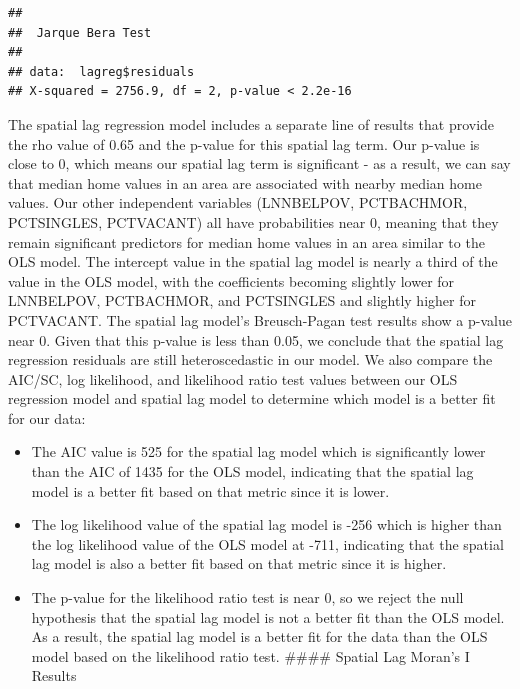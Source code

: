 \documentclass[
]{article}
\providecommand{\tightlist}{%
  \setlength{\itemsep}{0pt}\setlength{\parskip}{0pt}}
\begin{document}
\begin{verbatim}
## 
##  Jarque Bera Test
## 
## data:  lagreg$residuals
## X-squared = 2756.9, df = 2, p-value < 2.2e-16
\end{verbatim}

The spatial lag regression model includes a separate line of results
that provide the rho value of 0.65 and the p-value for this spatial lag
term. Our p-value is close to 0, which means our spatial lag term is
significant - as a result, we can say that median home values in an area
are associated with nearby median home values. Our other independent
variables (LNNBELPOV, PCTBACHMOR, PCTSINGLES, PCTVACANT) all have
probabilities near 0, meaning that they remain significant predictors
for median home values in an area similar to the OLS model. The
intercept value in the spatial lag model is nearly a third of the value
in the OLS model, with the coefficients becoming slightly lower for
LNNBELPOV, PCTBACHMOR, and PCTSINGLES and slightly higher for PCTVACANT.
The spatial lag model's Breusch-Pagan test results show a p-value near
0. Given that this p-value is less than 0.05, we conclude that the
spatial lag regression residuals are still heteroscedastic in our model.
We also compare the AIC/SC, log likelihood, and likelihood ratio test
values between our OLS regression model and spatial lag model to
determine which model is a better fit for our data:

\begin{itemize}
\tightlist
\item
  The AIC value is 525 for the spatial lag model which is significantly
  lower than the AIC of 1435 for the OLS model, indicating that the
  spatial lag model is a better fit based on that metric since it is
  lower.
\item
  The log likelihood value of the spatial lag model is -256 which is
  higher than the log likelihood value of the OLS model at -711,
  indicating that the spatial lag model is also a better fit based on
  that metric since it is higher.
\item
  The p-value for the likelihood ratio test is near 0, so we reject the
  null hypothesis that the spatial lag model is not a better fit than
  the OLS model. As a result, the spatial lag model is a better fit for
  the data than the OLS model based on the likelihood ratio test.
  \#\#\#\# Spatial Lag Moran's I Results
\end{itemize}
\end{document}
